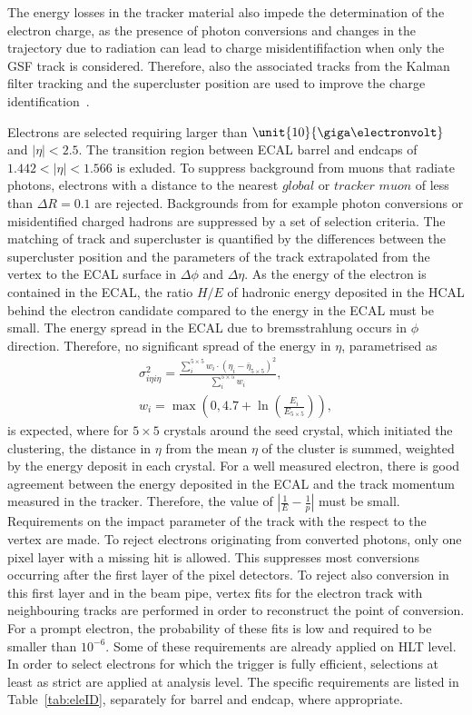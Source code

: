 The energy losses in the tracker material also impede the determination of the electron charge, as the presence of photon conversions and changes in the trajectory due to radiation can lead to charge misidentififaction when only the GSF track is considered. Therefore, also the associated tracks from the Kalman filter tracking and the supercluster position are used to improve the charge identification~\cite{Khachatryan:2015hwa}.

Electrons are selected requiring \pt larger than $\unit{10}{\giga\electronvolt}$ and $|\eta| < 2.5$. The transition region between ECAL barrel and endcaps of $1.442 < |\eta| < 1.566$ is exluded. To suppress background from muons that radiate photons, electrons with a distance to the nearest $\textit{global}$ or $\textit{tracker muon}$ of less than $\Delta R = 0.1$ are rejected. Backgrounds from for example photon conversions or misidentified charged hadrons are suppressed by a set of selection criteria. The matching of track and supercluster is quantified by the differences between the supercluster position and the parameters of the track extrapolated from the vertex to the ECAL surface in $\Delta\phi$ and $\Delta\eta$. As the energy of the electron is contained in the ECAL, the ratio $H/E$ of hadronic energy deposited in the HCAL behind the electron candidate compared to the energy in the ECAL must be small. The energy spread in the ECAL due to bremsstrahlung occurs in $\phi$ direction. Therefore, no significant spread of the energy in $\eta$, parametrised as
\begin{eqnarray}
\sigma_{i\eta i\eta}^2 = \frac{\sum\limits_i^{5\times 5} w_i\cdot \left(\eta_i - \bar{\eta}_{5\times 5}\right)^2}{\sum\limits_{i}^{5\times 5} w_i},\\
w_i = \max\left(0,4.7 + \ln\left(\frac{E_i}{E_{5 \times 5}}\right)\right),
\end{eqnarray}
is expected, where for $5\times 5$ crystals around the seed crystal, which initiated the clustering, the distance in $\eta$ from the mean $\eta$ of the cluster is summed, weighted by the energy deposit in each crystal. For a well measured electron, there is good agreement between the energy deposited in the ECAL and the track momentum measured in the tracker. Therefore, the value of $\left| \frac{1}{E} - \frac{1}{p}\right|$ must be small. Requirements on the impact parameter of the track with the respect to the vertex are made. To reject electrons originating from converted photons, only one pixel layer with a missing hit is allowed. This suppresses most conversions occurring after the first layer of the pixel detectors. To reject also conversion in this first layer and in the beam pipe, vertex fits for the electron track with neighbouring tracks are performed in order to reconstruct the point of conversion. For a prompt electron, the probability of these fits is low and required to be smaller than $10^{-6}.$ Some of these requirements are already applied on HLT level. In order to select electrons for which the trigger is fully efficient, selections at least as strict are applied at analysis level. The specific requirements are listed in Table~\ref{tab:eleID}, separately for barrel and endcap, where appropriate. 
